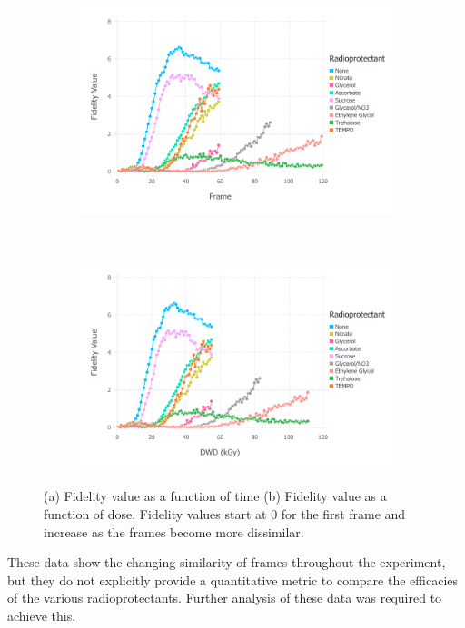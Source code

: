 \begin{figure}
    \ContinuedFloat
    \begin{subfigure}[b]{1.0\textwidth}
            \centering
            \includegraphics[width=\textwidth]{figures/saxs/cmpd_plt_frame.pdf}
            \caption{}
            \label{fig:1D scatter plot of frames 1 and 120}
    \end{subfigure}
    \\
    \begin{subfigure}[b]{1.0\textwidth}
            \centering
            \includegraphics[width=\textwidth]{figures/saxs/cmpd_plt_dose.pdf}
            \caption{}
            \label{fig:Pairwise correlation frames 1 and 120}
    \end{subfigure}
    \caption[Fidelity value as a function of time and dose.]{(a) Fidelity value as a function of time
    (b) Fidelity value as a function of dose.
    Fidelity values start at 0 for the first frame and increase as the frames become more dissimilar.}
    \label{fig:Rebecca data}
\end{figure}
These data show the changing similarity of frames throughout the experiment, but they do not explicitly provide a quantitative metric to compare the efficacies of the various radioprotectants.
Further analysis of these data was required to achieve this.

